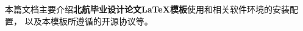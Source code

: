 
\begin{cabstract}
本篇文档主要介绍{\bf 北航毕业设计论文\LaTeX{}模板}使用和相关软件环境的安装配置，
以及本模板所遵循的开源协议等。
\end{cabstract}

\iffalse
\begin{eabstract}
Here is the Abstract in English. And this is a test sentence, just for
a test to see how the buaathesis works. You can just ignore this.\par
This is another pargraph.
\end{eabstract}
\fi
